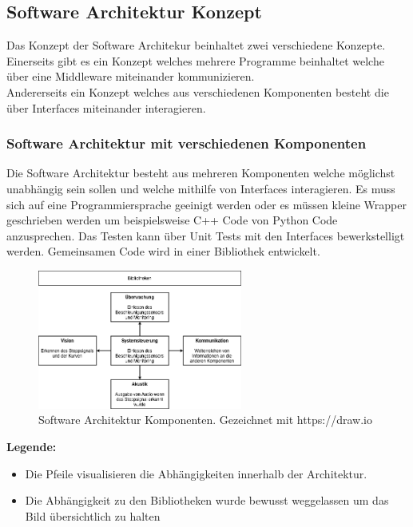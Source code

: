 \documentclass[../../../main.tex]{subfiles}
\begin{document}
\subsection{Software Architektur Konzept}
Das Konzept der Software Architekur beinhaltet zwei verschiedene Konzepte.
Einerseits gibt es ein Konzept welches mehrere Programme beinhaltet welche über eine Middleware miteinander kommunizieren. \\
Andererseits ein Konzept welches aus verschiedenen Komponenten besteht die über Interfaces miteinander interagieren. \\

\subsubsection{Software Architektur mit verschiedenen Komponenten}
Die Software Architektur besteht aus mehreren Komponenten welche möglichst unabhängig sein sollen und welche mithilfe von Interfaces interagieren.
Es muss sich auf eine Programmiersprache geeinigt werden oder es müssen kleine Wrapper geschrieben werden um beispielsweise
C++ Code von Python Code anzusprechen. Das Testen kann über Unit Tests mit den Interfaces bewerkstelligt werden.
Gemeinsamen Code wird in einer Bibliothek entwickelt.

\begin{figure}[H] %
    \centering
    \includegraphics[width=0.6\textwidth]{drawings/ArchitekturDiagramm/SW_Architektur.png}
    \caption {Software Architektur Komponenten. Gezeichnet mit https://draw.io}
\end{figure}

\textbf{Legende:}
\begin{itemize}
    \item Die Pfeile visualisieren die Abhängigkeiten innerhalb der Architektur.
    \item Die Abhängigkeit zu den Bibliotheken wurde bewusst weggelassen um das Bild übersichtlich zu halten
\end{itemize}
\end{document}
